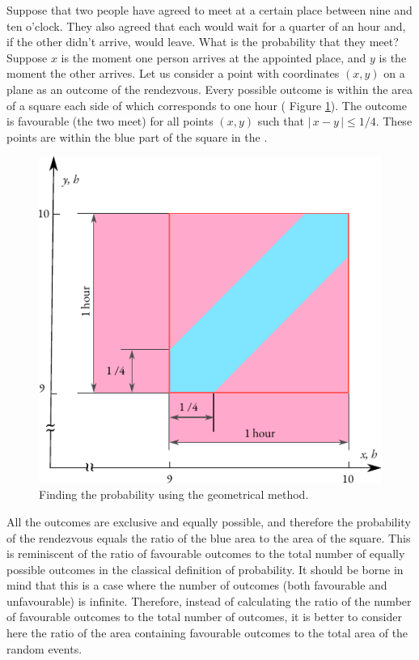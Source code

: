 Suppose that two people have agreed to meet at a certain place between
nine and ten o'clock. They also agreed that each would wait for a
quarter of an hour and, if the other didn't arrive, would leave. What
is the probability that they meet?  Suppose $x$ is the moment one
person arrives at the appointed place, and $y$ is the moment the other
arrives. Let us consider a point with coordinates $(x, y)$ on a plane
as an outcome of the rendezvous. Every possible outcome is within the
area of a square each side of which corresponds to one hour ( Figure
\ref{prob-meeting}). The outcome is favourable (the two meet) for all
points $(x, y)$ such that $\vert \, x - y \, \vert \le 1/4$. These
points are within the blue part of the square in the . 
  
  \begin{figure}[ht]
 \centering
 \includegraphics[width=0.9\tfwidth]{figures/prob-meeting.pdf}
\caption{Finding the probability using the geometrical method.\label{prob-meeting}}
 \end{figure}
  
  All the outcomes are exclusive
and equally possible, and therefore the probability of the rendezvous
equals the ratio of the blue area to the area of the square. This
is reminiscent of the ratio of favourable outcomes to the total number
of equally possible outcomes in the classical definition of
probability. It should be borne in mind that this is a case where the
number of outcomes (both favourable and unfavourable) is
infinite. Therefore, instead of calculating the ratio of the number of
favourable outcomes to the total number of outcomes, it is better to
consider here the ratio of the area containing favourable outcomes to
the total area of the random events.




